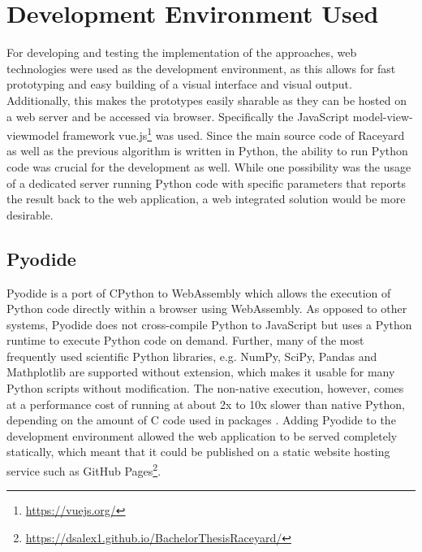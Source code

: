 \section{Development Environment Used}
For developing and testing the implementation of the approaches, web technologies were used as the development environment, as this allows for fast prototyping and easy building of a visual interface and visual output. Additionally, this makes the prototypes easily sharable as they can be hosted on a web server and be accessed via browser. Specifically the JavaScript model-view-viewmodel framework vue.js\footnote{\url{https://vuejs.org/}} was used. Since the main source code of Raceyard as well as the previous algorithm is written in Python, the ability to run Python code was crucial for the development as well. While one possibility was the usage of a dedicated server running Python code with specific parameters that reports the result back to the web application, a web integrated solution would be more desirable.

\subsection{Pyodide}
Pyodide is a port of CPython to WebAssembly \cite{pyodide} which allows the execution of Python code directly within a browser using WebAssembly. As opposed to other systems, Pyodide does not cross-compile Python to JavaScript but uses a Python runtime to execute Python code on demand. Further, many of the most frequently used scientific Python libraries, e.g. NumPy, SciPy, Pandas and Mathplotlib are supported without extension, which makes it usable for many Python scripts without modification. The non-native execution, however, comes at a performance cost of running at about 2x to 10x slower than native Python, depending on the amount of C code used in packages \cite{pyodide2021}\cite{Jangda2019}. Adding Pyodide to the development environment allowed the web application to be served completely statically, which meant that it could be published on a static website hosting service such as GitHub Pages\footnote{\url{https://dsalex1.github.io/BachelorThesisRaceyard/}}.